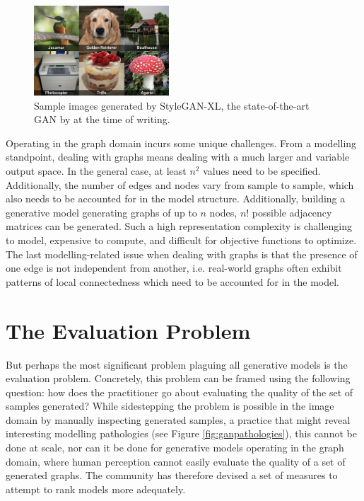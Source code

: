 \begin{figure}
  \centering
  \includegraphics[width=0.45\textwidth]{./figures/representative_image.jpg}
  \caption[Sample images generated by StyleGAN-XL]{Sample images generated by StyleGAN-XL, the state-of-the-art GAN
by \cite{sauer2022stylegan} at the time of writing.}
  \label{fig:styleganxl}
\end{figure}

Operating in the graph domain incurs some unique challenges. From a modelling
standpoint, dealing with graphs means dealing with a much larger and variable
output space. In the general case, at least $n^2$ values need to be specified.
Additionally, the number of edges and nodes vary from sample to sample, which
also needs to be accounted for in the model structure. Additionally, building a
generative model generating graphs of up to $n$ nodes, $n!$ possible adjacency
matrices can be generated. Such a high representation complexity is challenging
to model, expensive to compute, and difficult for objective functions to
optimize. The last modelling-related issue when dealing with graphs is that the
presence of one edge is not independent from another, i.e. real-world graphs
often exhibit patterns of local connectedness which need to be accounted for in
the model.

\section{The Evaluation Problem}\label{sec:evalproblem}

But perhaps the most significant problem plaguing all generative models is the
evaluation problem. Concretely, this problem can be framed using the following
question: how does the practitioner go about evaluating the quality of the set
of samples generated? While sidestepping the problem is possible in the image
domain by manually inspecting generated samples, a practice that might reveal
interesting modelling pathologies (see Figure \ref{fig:ganpathologies}), this
cannot be done at scale, nor can it be done for generative models operating in
the graph domain, where human perception cannot easily evaluate the quality of a
set of generated graphs. The community has therefore devised a set of measures
to attempt to rank models more adequately.


